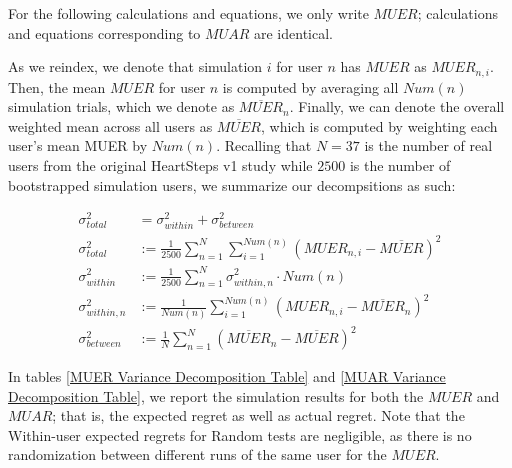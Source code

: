 For the following calculations and equations, we only write $MUER$; calculations and equations corresponding to $MUAR$ are identical.

As we reindex, we denote that simulation $i$ for user $n$ has $MUER$ as $MUER_{n,i}$.  Then, the mean $MUER$ for user $n$ is computed by averaging all $Num(n)$ simulation trials, which we denote as $\overline{MUER}_{n}$.  Finally, we can denote the overall weighted mean across all users as $\overline{MUER}$, which is computed by weighting each user's mean MUER by $Num(n)$.  Recalling that $N = 37$ is the number of real users from the original HeartSteps v1 study while $2500$ is the number of bootstrapped simulation users, we summarize our decompsitions as such:

\begin{align}
\sigma^2_{total} &= \sigma^2_{within} + \sigma^2_{between} \\
\sigma^2_{total} &:= \frac{1}{2500} \sum_{n=1}^N \sum_{i=1}^{Num(n)} \left(MUER_{n,i} - \overline{MUER}\right)^2 \\
\sigma^2_{within} &:= \frac{1}{2500} \sum_{n=1}^{N} \sigma^2_{within,n} \cdot Num(n) \\
\sigma^2_{within,n} &:= \frac{1}{Num(n)} \sum_{i=1}^{Num(n)} \left(MUER_{n,i} - \overline{MUER}_{n}\right)^2 \\
\sigma^2_{between} &:=  \frac{1}{N} \sum_{n=1}^{N} \left(\overline{MUER}_{n} - \overline{MUER} \right)^2
\end{align}


In tables \ref{MUER Variance Decomposition Table} and \ref{MUAR Variance Decomposition Table}, we report the simulation results for both the $MUER$ and $MUAR$; that is, the expected regret as well as actual regret.  Note that the Within-user expected regrets for Random tests are negligible, as there is no randomization between different runs of the same user for the $MUER$.

